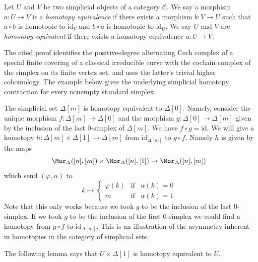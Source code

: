 \begin{definition}
\label{definition-homotopy-equivalent}
Let $U$ and $V$ be two simplicial objects of a category $\mathcal{C}$.
We say a morphism $a : U \to V$ is a {\it homotopy equivalence}
if there exists a morphism $b : V \to U$ such that $a \circ b$ is
homotopic to $\text{id}_V$ and $b \circ a$ is homotopic to $\text{id}_U$.
We say $U$ and $V$ are {\it homotopy equivalent} if there
exists a homotopy equivalence $a : U \to V$.
\end{definition}

\begin{example}
\label{example-simplex-contractible}
\begin{reference}
\cite[Chapter III, \S 1, no. 53, Lemma 4, p. 246]{FAC}
\end{reference}
\begin{history}
The cited proof identifies the positive-degree alternating Cech complex of a
special finite covering of a classical irreducible curve with the cochain
complex of the simplex on its finite vertex set, and uses the latter's
trivial higher cohomology. The example below gives the underlying simplicial
homotopy contraction for every nonempty standard simplex.
\end{history}
The simplicial set $\Delta[m]$ is homotopy equivalent to $\Delta[0]$.
Namely, consider the unique morphism $f : \Delta[m] \to \Delta[0]$ and
the morphism $g : \Delta[0] \to \Delta[m]$ given by the inclusion of the
last $0$-simplex of $\Delta[m]$. We have $f \circ g = \text{id}$.
We will give a homotopy $h : \Delta[m] \times \Delta[1] \to \Delta[m]$
from $\text{id}_{\Delta[m]}$ to $g \circ f$. Namely $h$ is given by
the maps
$$
\Mor_\Delta([n], [m]) \times \Mor_\Delta([n], [1]) \to \Mor_\Delta([n], [m])
$$
which send $(\varphi, \alpha)$ to
$$
k \mapsto
\left\{
\begin{matrix}
\varphi(k) & \text{if} & \alpha(k) = 0 \\
m & \text{if} & \alpha(k) = 1
\end{matrix}
\right.
$$
Note that this only works because we took $g$ to be the inclusion of the
last $0$-simplex. If we took $g$ to be the inclusion of the first $0$-simplex
we could find a homotopy from $g \circ f$ to $\text{id}_{\Delta[m]}$.
This is an illustration of the asymmetry inherent in homotopies in the
category of simplicial sets.
\end{example}

\noindent
The following lemma says that $U \times \Delta[1]$
is homotopy equivalent to $U$.


